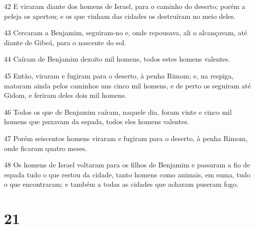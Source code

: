 \par 42 E viraram diante dos homens de Israel, para o caminho do deserto; porém a peleja os apertou; e os que vinham das cidades os destruíram no meio deles.
\par 43 Cercaram a Benjamim, seguiram-no e, onde repousava, ali o alcançavam, até diante de Gibeá, para o nascente do sol.
\par 44 Caíram de Benjamim dezoito mil homens, todos estes homens valentes.
\par 45 Então, viraram e fugiram para o deserto, à penha Rimom; e, na respiga, mataram ainda pelos caminhos uns cinco mil homens, e de perto os seguiram até Gidom, e feriram deles dois mil homens.
\par 46 Todos os que de Benjamim caíram, naquele dia, foram vinte e cinco mil homens que puxavam da espada, todos eles homens valentes.
\par 47 Porém seiscentos homens viraram e fugiram para o deserto, à penha Rimom, onde ficaram quatro meses.
\par 48 Os homens de Israel voltaram para os filhos de Benjamim e passaram a fio de espada tudo o que restou da cidade, tanto homens como animais, em suma, tudo o que encontraram; e também a todas as cidades que acharam puseram fogo.

\chapter{21}

